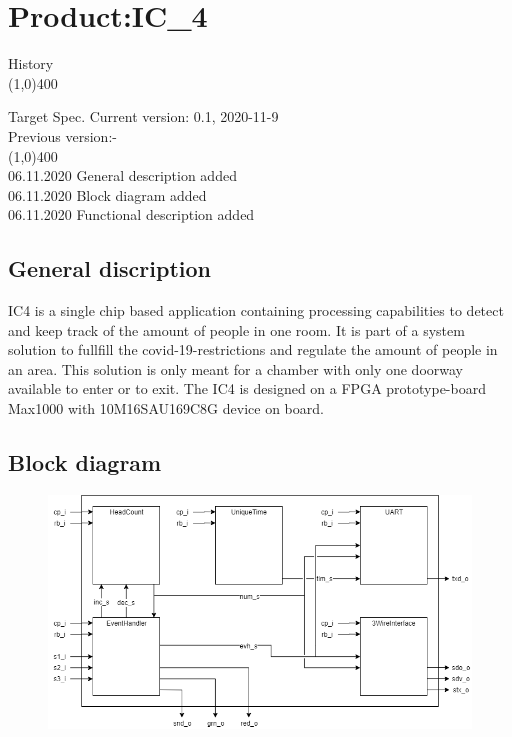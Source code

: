 \documentclass[12pt,a4 paper] {article}
\begin{document}
\newpage
\section{Product:IC\_4}


History\\
\line(1,0){400}
\begin{flushleft}
	Target Spec. Current version: 0.1, 2020-11-9 \\
\hspace{2.2cm}	Previous version:-\\
\line(1,0){400}\\	             
\hspace{2.2cm}	06.11.2020 \hfill General description added\\
\hspace{2.2cm}	06.11.2020 \hfill Block diagram added\\
\hspace{2.2cm}	06.11.2020	\hfill Functional description added
\end{flushleft}


		 
\subsection{General discription}
IC4 is a single chip based application containing processing capabilities to detect and keep track of the amount of people in one room. It is part of a system solution to fullfill the covid-19-restrictions and regulate the amount of people in an area. This solution is only meant for a chamber with only one doorway available to enter or to exit.\newline
The IC4 is designed on a FPGA prototype-board Max1000 with 10M16SAU169C8G device on board.
\newpage	
\subsection{Block diagram}
\begin{figure}[h]
	\centering	
	\includegraphics[scale=0.6]{../png/top.png}
\end{figure}
\newpage
\end{document}
